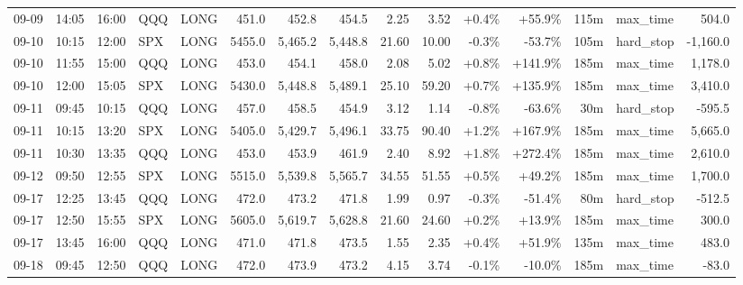 \documentclass[11pt,a4paper,twoside]{article}
\begin{document}
\begin{landscape}
\begin{center}
\begin{longtable}{>{\color{txtmain}}l l l l l r r r r r r r r >{\color{txtmain}}l r}
09-09 & 14:05 & 16:00 & QQQ & LONG & 451.0 & 452.8 & 454.5 & 2.25 & 3.52 & \textcolor{wingreen}{+0.4\%} & \textcolor{wingreen}{+55.9\%} & 115m & max\_time & \textcolor{wingreen}{504.0} \\
09-10 & 10:15 & 12:00 & SPX & LONG & 5455.0 & 5,465.2 & 5,448.8 & 21.60 & 10.00 & \textcolor{lossred}{-0.3\%} & \textcolor{lossred}{-53.7\%} & 105m & hard\_stop & \textcolor{lossred}{-1,160.0} \\
09-10 & 11:55 & 15:00 & QQQ & LONG & 453.0 & 454.1 & 458.0 & 2.08 & 5.02 & \textcolor{wingreen}{+0.8\%} & \textcolor{wingreen}{+141.9\%} & 185m & max\_time & \textcolor{wingreen}{1,178.0} \\
09-10 & 12:00 & 15:05 & SPX & LONG & 5430.0 & 5,448.8 & 5,489.1 & 25.10 & 59.20 & \textcolor{wingreen}{+0.7\%} & \textcolor{wingreen}{+135.9\%} & 185m & max\_time & \textcolor{wingreen}{3,410.0} \\
09-11 & 09:45 & 10:15 & QQQ & LONG & 457.0 & 458.5 & 454.9 & 3.12 & 1.14 & \textcolor{lossred}{-0.8\%} & \textcolor{lossred}{-63.6\%} & 30m & hard\_stop & \textcolor{lossred}{-595.5} \\
09-11 & 10:15 & 13:20 & SPX & LONG & 5405.0 & 5,429.7 & 5,496.1 & 33.75 & 90.40 & \textcolor{wingreen}{+1.2\%} & \textcolor{wingreen}{+167.9\%} & 185m & max\_time & \textcolor{wingreen}{5,665.0} \\
09-11 & 10:30 & 13:35 & QQQ & LONG & 453.0 & 453.9 & 461.9 & 2.40 & 8.92 & \textcolor{wingreen}{+1.8\%} & \textcolor{wingreen}{+272.4\%} & 185m & max\_time & \textcolor{wingreen}{2,610.0} \\
09-12 & 09:50 & 12:55 & SPX & LONG & 5515.0 & 5,539.8 & 5,565.7 & 34.55 & 51.55 & \textcolor{wingreen}{+0.5\%} & \textcolor{wingreen}{+49.2\%} & 185m & max\_time & \textcolor{wingreen}{1,700.0} \\
09-17 & 12:25 & 13:45 & QQQ & LONG & 472.0 & 473.2 & 471.8 & 1.99 & 0.97 & \textcolor{lossred}{-0.3\%} & \textcolor{lossred}{-51.4\%} & 80m & hard\_stop & \textcolor{lossred}{-512.5} \\
09-17 & 12:50 & 15:55 & SPX & LONG & 5605.0 & 5,619.7 & 5,628.8 & 21.60 & 24.60 & \textcolor{wingreen}{+0.2\%} & \textcolor{wingreen}{+13.9\%} & 185m & max\_time & \textcolor{wingreen}{300.0} \\
09-17 & 13:45 & 16:00 & QQQ & LONG & 471.0 & 471.8 & 473.5 & 1.55 & 2.35 & \textcolor{wingreen}{+0.4\%} & \textcolor{wingreen}{+51.9\%} & 135m & max\_time & \textcolor{wingreen}{483.0} \\
09-18 & 09:45 & 12:50 & QQQ & LONG & 472.0 & 473.9 & 473.2 & 4.15 & 3.74 & \textcolor{lossred}{-0.1\%} & \textcolor{lossred}{-10.0\%} & 185m & max\_time & \textcolor{lossred}{-83.0} \\

\end{longtable}
\end{center}
\end{landscape}
\end{document}
